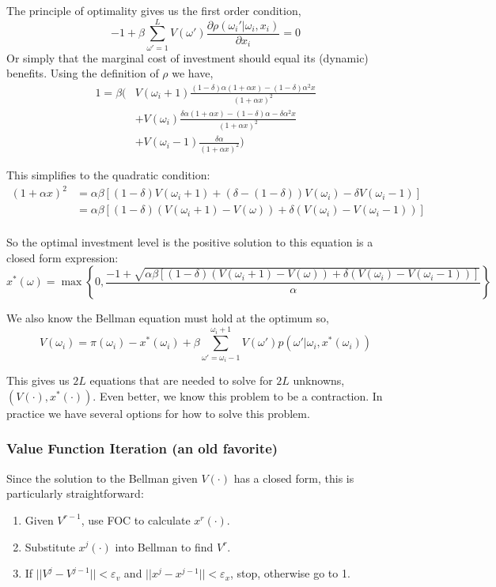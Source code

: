 \documentclass[twoside]{article}
\begin{document}
The principle of optimality gives us the first order condition, 
$$ -1 + \beta  \sum_{\omega' = 1}^L V(\omega') \frac{\partial \rho(\omega_i' | \omega_i, x_i)}{\partial x_i} = 0 $$
Or simply that the marginal cost of investment should equal its (dynamic) benefits. Using the definition of $\rho$ we have, 
\begin{align*}
1 = \beta \bigg( & V(\omega_i + 1)  \frac{(1-\delta)\alpha(1+\alpha x) - (1-\delta) \alpha^2 x}{(1 + \alpha x)^2}\\
& + V(\omega_i) \frac{\delta \alpha (1+\alpha x) - (1-\delta) \alpha - \delta \alpha^2 x}{(1 + \alpha x)^2} \\
& +V(\omega_i - 1) \frac{\delta \alpha}{(1+\alpha x)^2} \bigg)
\end{align*}

This simplifies to the quadratic condition: 
\begin{align*}
(1 + \alpha x)^2 & = \alpha \beta \left[ (1 - \delta) V(\omega_i + 1) + (\delta - (1 - \delta)) V(\omega_i) - \delta V(\omega_i - 1) \right] \\
& = \alpha \beta \left[ (1 - \delta) (V(\omega_i + 1) - V(\omega)) + \delta(V(\omega_i) - V(\omega_i - 1)) \right]  \\
\end{align*}

So the optimal investment level is the positive solution to this equation is a closed form expression: 
$$ x^*(\omega) = \max\left\{0, \frac{-1 + \sqrt{\alpha \beta \left[ (1 - \delta) (V(\omega_i + 1) - V(\omega)) + \delta(V(\omega_i) -  V(\omega_i - 1)) \right] } }{\alpha} \right\} $$

We also know the Bellman equation must hold at the optimum so, 
$$ V(\omega_i) = \pi(\omega_i) - x^*(\omega_i) + \beta \sum_{\omega' = \omega_i-1}^{\omega_i + 1} V(\omega') p(\omega' | \omega_i, x^*(\omega_i))$$

This gives us $2L$ equations that are needed to solve for $2L$ unknowns, $(V(\cdot), x^*(\cdot))$. Even better, we know this problem to be a contraction. 
In practice we have several options for how to solve this problem. 

\subsubsection{Value Function Iteration (an old favorite)}

Since the solution to the Bellman given $V(\cdot)$ has a closed form, this is particularly straightforward: 
\begin{enumerate}
\item Given $V^{r-1}$, use FOC to calculate $x^r(\cdot)$. 
\item Substitute $x^j(\cdot)$ into Bellman to find $V^r$. 
\item If $||V^j - V^{j-1}|| < \varepsilon_v$ and $||x^j - x^{j-1}|| < \varepsilon_x$, stop, otherwise go to 1. 
\end{enumerate}
\end{document}
